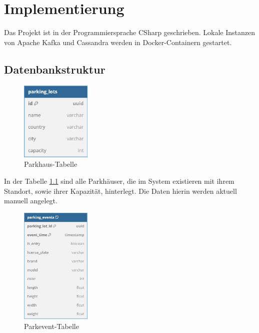 \chapter{Implementierung}

Das Projekt ist in der Programmiersprache CSharp geschrieben.
Lokale Instanzen von Apache Kafka und Cassandra werden in Docker-Containern gestartet.


\section{Datenbankstruktur}

\begin{figure}[h!]%
    \centering%
    \includegraphics[width=0.3\textwidth]{Graphics/ParkingLotTable.png}%
    \caption{Parkhaus-Tabelle}%
    \label{fig:table_parking_lots}
\end{figure}%

In der Tabelle \ref{fig:table_parking_lots} sind alle Parkhäuser, die im System existieren mit ihrem Standort, sowie ihrer Kapazität, hinterlegt.
Die Daten hierin werden aktuell manuell angelegt.

\begin{figure}[h!]%
    \centering%
    \includegraphics[width=0.3\textwidth]{Graphics/parking_events.png}%
    \caption{Parkevent-Tabelle}%
    \label{fig:table_parking_events}
\end{figure}%

